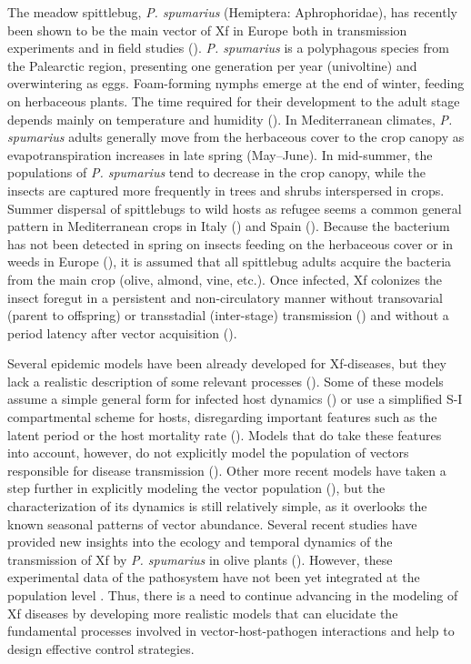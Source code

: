 The meadow spittlebug,	\textit{P. spumarius} (Hemiptera: Aphrophoridae),
has recently been shown to be the main vector of Xf in Europe both in
transmission experiments and in field studies
(\cite{Cornara2017,Cornara2018,lopez2022mechanical,Moralejo2019,saponari2019xylella}).
\textit{P. spumarius} is a polyphagous species from the Palearctic region,
presenting one generation per year (univoltine) and overwintering as eggs.
Foam-forming nymphs emerge at the end of winter, feeding on herbaceous plants.
The time required for their development to the adult stage depends mainly on
temperature and humidity
(\cite{bodino2019phenology,Chmiel1979,cornara2018philaenus}). In Mediterranean
climates,  \textit{P. spumarius} adults generally move from the herbaceous
cover to the crop canopy as evapotranspiration increases in late spring
(May–June). In mid-summer, the populations of \textit{P. spumarius} tend to
decrease in the crop canopy, while the insects are captured more frequently in
trees and shrubs interspersed in crops. Summer dispersal of spittlebugs to wild
hosts as refugee seems a common general pattern in Mediterranean crops in Italy
(\cite{bodino2019phenology,cornara2021natural}) and Spain
(\cite{morente2018distribution}). Because the bacterium has not been detected
in spring on insects feeding on the herbaceous cover or in weeds in Europe
(\cite{bodino2019phenology,cornara2018philaenus,Olmo2021b}), it is assumed that
all spittlebug adults acquire the bacteria from the main crop (olive, almond,
vine, etc.). Once infected, Xf colonizes the insect foregut in a persistent and
non-circulatory manner without transovarial (parent to offspring) or
transstadial (inter-stage) transmission
(\cite{Almeida2003,freitag1951host,purcell1979evidence}) and without
a period latency after vector acquisition (\cite{Almeida2015,freitag1951host}).

Several epidemic models have been already developed for Xf-diseases, but
they lack a realistic description of some relevant processes
(\cite{Jeger2019}). Some of these models assume a simple general form for
infected host dynamics (\cite{White2017,Abboud2019,Daugherty2019}) or use a
simplified S-I compartmental scheme for hosts, disregarding important features
such as the latent period or the host mortality rate (\cite{Soubeyrand2018}).
Models that do take these features into account, however, do not explicitly
model the population of vectors responsible for disease transmission
(\cite{White2020}). Other more recent models have taken a step further in
explicitly modeling the vector population (\cite{BRUNETTI2020,
    GimenezRomero2022_CommsBio}), but the characterization of its dynamics is
still
relatively simple, as it overlooks the known seasonal patterns of vector
abundance. Several recent studies have provided new insights into the ecology
and temporal dynamics of the transmission of Xf by \textit{P. spumarius} in
olive plants (\cite{Bodino2021,bodino2019phenology}). However, these
experimental data of the pathosystem have not been yet integrated at the
population level . Thus, there is a need to continue advancing in the modeling
of Xf diseases by developing more realistic models that can elucidate the
fundamental processes involved in vector-host-pathogen interactions and help to
design effective control strategies.

